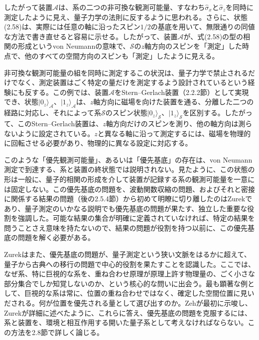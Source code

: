 したがって装置$\mathcal A$は、系の二つの非可換な観測可能量、すなわち$\hat\sigma_x$と$\hat\sigma_z$を同時に測定したように見え、量子力学の法則に反するように思われる。さらに、状態(2.58)は、実際には任意の軸に沿ったスピン$1/2$の基底を用いて、無限通りの同値な方法で書き直せると容易に示せる。したがって、装置$\mathcal A$が、式(2.58)の型の相関の形成というvon Neumannの意味で、$\mathcal S$の$z$軸方向のスピンを「測定」した時点で、他のすべての空間方向のスピンも「測定」したように見える。

非可換な観測可能量の組を同時に測定するこの状況は、量子力学で禁止されるだけでなく、測定装置はごく特定の量だけを測定するよう設計されているという経験にも反する。この例では、装置$\mathcal A$をStern--Gerlach装置（2.2.2節）として実現でき、状態$\lvert0_z\rangle_{\mathcal A}$、$\lvert1_z\rangle_{\mathcal A}$は、$z$軸方向に磁場を向けた装置を通る、分離した二つの経路に対応し、それによって系$\mathcal S$のスピン状態$\lvert0_z\rangle_{\mathcal S}$、$\lvert1_z\rangle_{\mathcal S}$を区別する。したがって、このStern--Gerlach装置は、$z$軸方向だけのスピンを測り、他の軸方向は測らないように設定されている。$z$と異なる軸に沿って測定するには、磁場を物理的に回転させる必要があり、物理的に異なる設定に対応する。

\hypertarget{srcpage:55}{}\label{srcpage:55}
このような「優先観測可能量」、あるいは「優先基底」の存在は、von Neumann測定で到達する、系と装置の終状態では説明されない。見たように、この状態の形は一般に、量子的相関の形成を介して装置が記録する系の観測可能量を一意には固定しない。この優先基底の問題を、波動関数収縮の問題、およびそれと密接に関係する結果の問題（後の2.5.4節）から初めて明瞭に切り離したのはZurek\cite{ref008}であり、量子測定のいかなる説明でも優先基底の問題が果たす、独立した重要な役割を強調した。可能な結果の集合が明確に定義されていなければ、特定の結果を問うことさえ意味を持たないので、結果の問題が役割を持つ以前に、この優先基底の問題を解く必要がある。

Zurekはまた\cite{ref008,ref009}、優先基底の問題が、量子測定という狭い文脈をはるかに超えて、量子から古典への移行の問題で中心的役割を果たすことを認識した。ここでは、なぜ系、特に巨視的な系を、重ね合わせ原理が原理上許す物理量の、ごく小さな部分集合でしか知覚しないのか、という核心的な問いに出会う。最も顕著な例として、巨視的な系は常に、位置の重ね合わせではなく、確定した空間位置に見いだされる。何が位置を優先される量として選び出すのか。Zeh\cite{ref004}が最初に示唆し、Zurek\cite{ref008,ref009}が詳細に述べたように、これらに答え、優先基底の問題を克服するには、系と装置を、環境と相互作用する開いた量子系として考えなければならない。この方法を2.8節で詳しく論じる。
